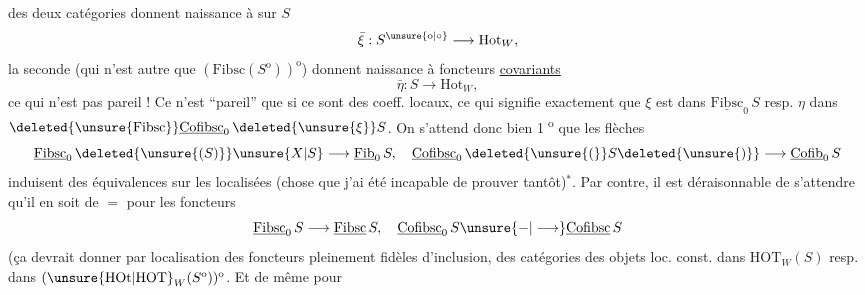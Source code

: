 des deux catégories donnent naissance  à    sur $S$
\[
 \bar{\xi}:S^{\unsure{\mathrm o|\circ}}\longrightarrow\mathrm{Hot}_W,
\]
 la seconde (qui n'est autre que $(\mathrm{Fibsc}(S^{\mathrm o}))^{\mathrm o}$) donnent naissance  à  foncteurs \uline{covariants}
\[
 \bar{\eta}:S\longrightarrow\mathrm{Hot}_W,
\]
ce qui n'est pas pareil ! Ce n'est ``pareil'' que si ce sont des coeff. locaux, ce qui signifie exactement que $\xi$ est dans $\underline{\mathrm{Fibsc}}_0\,S$ resp. $\eta$ dans $\deleted{\unsure{\mathrm{Fibsc}}}\underline{\mathrm{Cofibsc}}_0\,\deleted{\unsure{\xi}}S$. On s'attend donc bien \textcircled{\scriptsize 1\textsuperscript{o}} que les flèches
\[
 \underline{\mathrm{Fibsc}}_0\,\deleted{\unsure{(S)}}\unsure{X|S}\longrightarrow\underline{\mathrm{Fib}}_0\,S,\quad
 \underline{\mathrm{Cofibsc}}_0\,\deleted{\unsure{(}}S\deleted{\unsure{)}}\longrightarrow\underline{\mathrm{Cofib}}_0\,S
\]
induisent des équivalences sur les localisées (chose que j'ai été incapable de prouver tantôt)$^{*}$. 
Par contre, il est  déraisonnable de s'attendre  qu'il en soit de $=$ pour les foncteurs
\[
 \underline{\mathrm{Fibsc}}_0\,S\longrightarrow\underline{\mathrm{Fibsc}}\,S,\quad
 \underline{\mathrm{Cofibsc}}_0\,S\unsure{\mathord{-}|\longrightarrow}\underline{\mathrm{Cofibsc}}\,S
\]
(ça devrait donner par localisation des foncteurs pleinement fidèles d'inclusion, des catégories des objets loc. const. dans $\mathrm{HOT}_W(S)$ resp. dans $(\unsure{\mathrm{HOt}|\mathrm{HOT}}_W(S^{\mathrm o}))^{\mathrm o}$. Et de même pour
